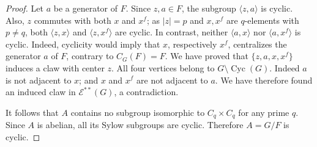 \documentclass[10pt,a4paper]{amsart}
\newcommand{\cyc}{\operatorname{Cyc}}
\begin{document}
\begin{proof}
Let $a$ be a generator of $F$.  Since $z,a\in F$, the subgroup
$\langle z,a\rangle$ is cyclic.  Also, $z$ commutes with both $x$ and $x^f$;
as $|z|=p$ and $x,x^f$ are $q$-elements with $p\ne q$, both
$
   \langle z,x\rangle$
and $\langle z,x^f\rangle
$
are cyclic.
In contrast, neither $\langle a,x\rangle$ nor $\langle a,x^f\rangle$ is
cyclic.  Indeed, cyclicity would imply that $x$, respectively $x^f$,
centralizes the generator $a$ of $F$, contrary to
$C_G(F)=F$. We have proved that $\{z,a,x,x^f\}$
induces a claw with center $z$.
All four vertices belong to $G\setminus\cyc(G)$.
Indeed  $a$ is not adjacent to $x$; and $x$ and $x^f$ are not
adjacent to $a$.  We have therefore found an induced claw in
$\mathcal E^{**}(G)$, a contradiction.

It follows that $A$ contains no subgroup isomorphic to $C_q\times C_q$ for
any prime $q$.  Since $A$ is abelian, all its Sylow subgroups are cyclic.
Therefore $A=G/F$ is cyclic.
\end{proof}
\end{document}
